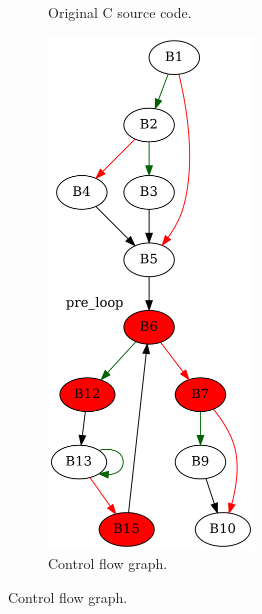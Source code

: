 \begin{figure}[htbp]
	\centering
	\begin{subfigure}[b]{0.30\textwidth}
		\centering
		
		\caption{Original C source code.}
	\end{subfigure}
	\begin{subfigure}[b]{0.50\textwidth}
		\centering
		\includegraphics[width=0.6\textwidth]{inc/appendices/examples/interval/example/sample/f_0003a.png}
		\caption{Control flow graph.}
	\end{subfigure}
\end{figure}

